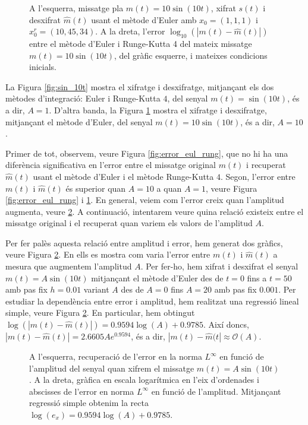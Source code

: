 \documentclass[11pt,a4paper,openright,oneside]{article}
\numberwithin{equation}{section}
\theoremstyle{definition}
\begin{document}
\begin{figure}[htbp]
    \centering
    \qquad
    \caption{A l'esquerra, missatge pla $m(t)=10\sin(10t)$, xifrat $s(t)$ i desxifrat $\hat{m}(t)$ usant el mètode d'Euler amb $x_0=(1,1,1)$ i $x_0^r=(10, 45, 34)$. A la dreta, l'error $\log_{10}(|m(t)-\hat{m}(t)|)$ entre el mètode d'Euler i Runge-Kutta 4 del mateix missatge $m(t)=10\sin(10t)$, del gràfic esquerre, i mateixes condicions inicials.}
    \label{fig:10sin_10t}
\end{figure} 

La Figura \ref{fig:sin_10t} mostra el xifratge i desxifratge, mitjançant els dos mètodes d'integració: Euler i Runge-Kutta $4$, del senyal $m(t)=\sin(10t)$, és a dir, $A=1$. D'altra banda, la Figura \ref{fig:10sin_10t} mostra el xifratge i desxifratge, mitjançant el mètode d'Euler, del senyal $m(t)=10\sin(10t)$, és a dir, $A=10$. 

Primer de tot, observem, veure Figura \ref{fig:error_eul_rung}, que no hi ha una diferència significativa en l'error entre el missatge original $m(t)$ i recuperat $\hat{m}(t)$ usant el mètode d'Euler i el mètode Runge-Kutta $4$. Segon, l'error entre $m(t)$ i $\hat{m}(t)$ és superior quan $A=10$ a quan $A=1$, veure Figura \ref{fig:error_eul_rung} i \ref{fig:10sin_10t}. En general, veiem com l'error creix quan l'amplitud augmenta, veure \ref{fig:freq_ampl}. A continuació, intentarem veure quina relació existeix entre el missatge original i el recuperat quan variem els valors de l'amplitud $A$.

Per fer palès aquesta relació entre amplitud i error, hem generat dos gràfics, veure Figura \ref{fig:freq_ampl}. En ells es mostra com varia l'error entre $m(t)$ i $\hat{m}(t)$ a mesura que augmentem l'amplitud $A$. Per fer-ho, hem xifrat i desxifrat el senyal $m(t)=A\sin(10t)$ mitjançant el mètode d'Euler des de $t=0$ fins a $t=50$ amb pas fix $h=0.01$ variant $A$ des de $A=0$ fins $A=20$ amb pas fix $0.001$. Per estudiar la dependència entre error i amplitud, hem realitzat una regressió lineal simple, veure Figura \ref{fig:freq_ampl}. En particular, hem obtingut $\log(|m(t)-\hat{m}(t)|)=0.9594\log(A)+0.9785$. Així doncs, $|m(t)-\hat{m}(t)|=2.6605Ae^{0.9594}$, és a dir, $|m(t)-\hat{m}(t|\approx \mathcal{O}(A)$.

\begin{figure}[htbp]
    \centering
    \qquad
    \caption{A l'esquerra, recuperació de l'error en la norma $L^{\infty}$ en funció de l'amplitud del senyal quan xifrem el missatge $m(t)=A\sin(10t)$. A la dreta, gràfica en escala logarítmica en l'eix d'ordenades i abscisses de l'error en norma $L^{\infty}$ en funció de l'amplitud. Mitjançant regressió simple obtenim la recta $\log(e_x)=0.9594\log(A)+0.9785$. }
    \label{fig:freq_ampl}
\end{figure} 
\end{document}
